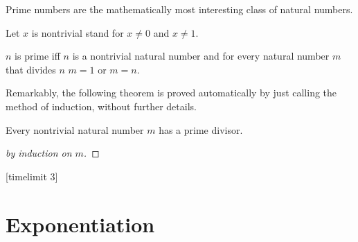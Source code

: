 \documentclass{article}
\begin{document}
%
Prime numbers are the mathematically most interesting
class of natural numbers.
%
\begin{forthel}
Let $x$ is nontrivial stand for $x \neq 0$ and $x \neq 1$.

\begin{definition}
$n$ is prime iff $n$ is a nontrivial natural number and
for every natural number $m$ that divides $n$ $m = 1$ or $m = n$.
\end{definition}
\end{forthel}
%
Remarkably, the following theorem is proved automatically by
just calling the method of induction, without further details.  
%
\begin{forthel}
[timelimit 10]
\begin{theorem}
Every nontrivial natural number $m$ has a prime divisor.
\end{theorem}
\begin{proof}[by induction on $m$]
\end{proof}
[timelimit 3]
\end{forthel}


\section{Exponentiation}
\end{document}
